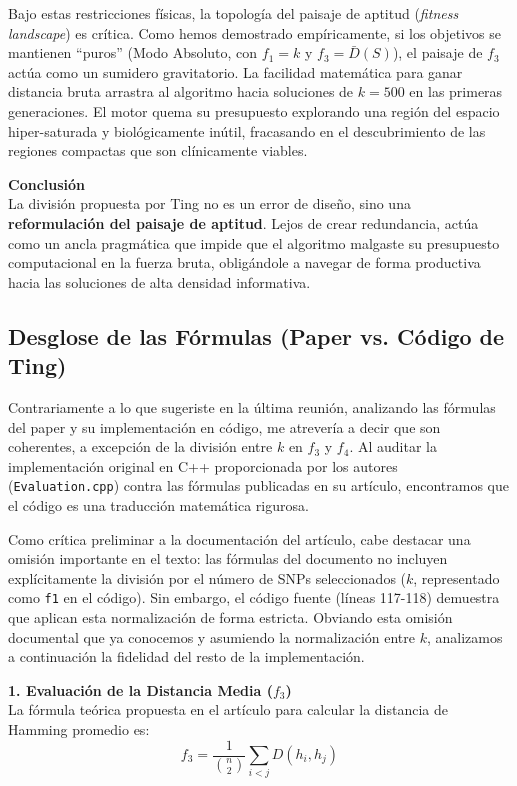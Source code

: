 \documentclass[11pt,a4paper]{article}
\begin{document}
Bajo estas restricciones físicas, la topología del paisaje de aptitud (\textit{fitness landscape}) es crítica. Como hemos demostrado empíricamente, si los objetivos se mantienen ``puros'' (Modo Absoluto, con $f_1 = k$ y $f_3 = \bar{D}(S)$), el paisaje de $f_3$ actúa como un sumidero gravitatorio. La facilidad matemática para ganar distancia bruta arrastra al algoritmo hacia soluciones de $k=500$ en las primeras generaciones. El motor quema su presupuesto explorando una región del espacio hiper-saturada y biológicamente inútil, fracasando en el descubrimiento de las regiones compactas que son clínicamente viables.

\textbf{Conclusión}\\
La división propuesta por Ting no es un error de diseño, sino una \textbf{reformulación del paisaje de aptitud}. Lejos de crear redundancia, actúa como un ancla pragmática que impide que el algoritmo malgaste su presupuesto computacional en la fuerza bruta, obligándole a navegar de forma productiva hacia las soluciones de alta densidad informativa.

\subsection{Desglose de las Fórmulas (Paper vs. Código de Ting)}

Contrariamente a lo que sugeriste en la última reunión, analizando las fórmulas del paper y su implementación en código, me atrevería a decir que son coherentes, a excepción de la división entre $k$ en $f_3$ y $f_4$. Al auditar la implementación original en C++ proporcionada por los autores (\texttt{Evaluation.cpp}) contra las fórmulas publicadas en su artículo, encontramos que el código es una traducción matemática rigurosa.

Como crítica preliminar a la documentación del artículo, cabe destacar una omisión importante en el texto: las fórmulas del documento no incluyen explícitamente la división por el número de SNPs seleccionados ($k$, representado como \texttt{f1} en el código). Sin embargo, el código fuente (líneas 117-118) demuestra que aplican esta normalización de forma estricta. Obviando esta omisión documental que ya conocemos y asumiendo la normalización entre $k$, analizamos a continuación la fidelidad del resto de la implementación.

\textbf{1. Evaluación de la Distancia Media ($f_3$)}\\
La fórmula teórica propuesta en el artículo para calcular la distancia de Hamming promedio es:
$$f_3 = \frac{1}{\binom{n}{2}} \sum_{i<j} D(h_i, h_j)$$
\end{document}
